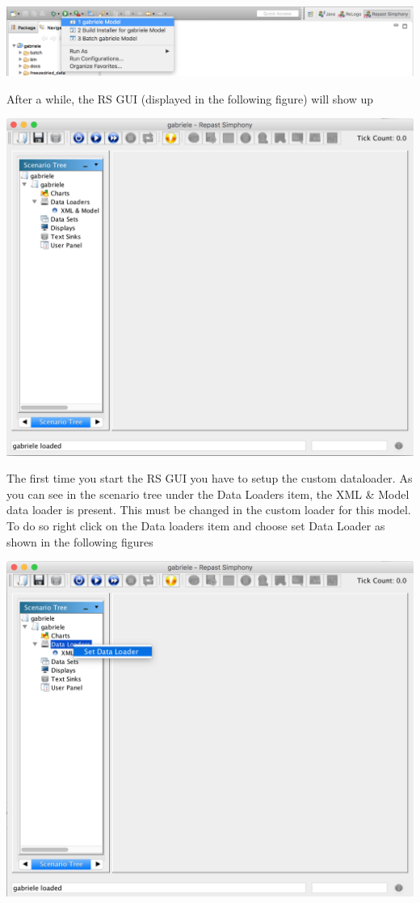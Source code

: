 \documentclass{book}
\begin{document}
\noindent
\includegraphics[scale=0.35]{fig_gabriele_rs_execution2}

After a while, the RS GUI (displayed in the following figure) will show up

\noindent
\includegraphics[scale=0.35]{fig_gabriele_rs_gui1}

The first time you start the RS GUI %
you have to setup the custom dataloader. As you can see in the scenario tree under the Data Loaders item, the XML \& Model data loader is present. This must be changed in the custom loader for this model. To do so right click on the Data loaders item and choose set Data Loader as shown in the following figures


\noindent
\includegraphics[scale=0.35]{fig_gabriele_rs_gui2}
\end{document}
